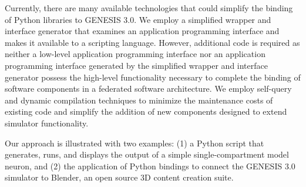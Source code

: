 \documentclass[10pt]{article}
\begin{document}
Currently, there are many available technologies that could simplify the binding of Python libraries to GENESIS 3.0.  We employ a simplified wrapper and interface
generator that
examines an application programming interface and makes it available to a scripting language.
However, additional code is required as neither a low-level application programming interface nor an application programming interface
generated by the simplified wrapper and interface
generator possess the high-level functionality necessary to
complete the binding of software components in a federated software architecture.
We employ self-query and dynamic
compilation techniques to minimize the maintenance costs of existing
code and simplify the addition of new components designed to extend simulator functionality.

Our approach is illustrated with two examples: (1) a Python script that
generates, runs, and displays the output of a simple single-compartment model neuron, and (2) the application of Python bindings
to connect the GENESIS 3.0 simulator to Blender, an open source 3D content
creation suite.  %

\end{document}
